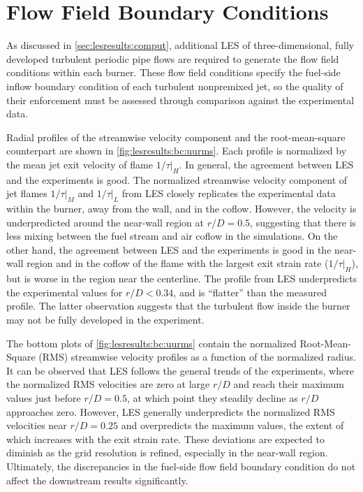 \section{Flow Field Boundary Conditions}
\label{sec:lesresults:bc}

As discussed in \cref{sec:lesresults:comput}, additional LES of three-dimensional, fully developed turbulent periodic pipe flows are required to generate the flow field conditions within each burner. These flow field conditions specify the fuel-side inflow boundary condition of each turbulent nonpremixed jet, so the quality of their enforcement must be assessed through comparison against the experimental data. 

Radial profiles of the streamwise velocity component and the root-mean-square counterpart are shown in \cref{fig:lesresults:bc:uurms}. Each profile is normalized by the mean jet exit velocity of flame $1/\tau|_H$. In general, the agreement between LES and the experiments is good. The normalized streamwise velocity component of jet flames $1/\tau|_M$ and $1/\tau|_L$ from LES closely replicates the experimental data within the burner, away from the wall, and in the coflow. However, the velocity is underpredicted around the near-wall region at $r/D = 0.5$, suggesting that there is less mixing between the fuel stream and air coflow in the simulations. On the other hand, the agreement between LES and the experiments is good in the near-wall region and in the coflow of the flame with the largest exit strain rate ($1/\tau|_H$), but is worse in the region near the centerline. The profile from LES underpredicts the experimental values for $r/D < 0.34$, and is ``flatter'' than the measured profile. The latter observation suggests that the turbulent flow inside the burner may not be fully developed in the experiment.

The bottom plots of \cref{fig:lesresults:bc:uurms} contain the normalized Root-Mean-Square (RMS) streamwise velocity profiles as a function of the normalized radius. It can be observed that LES follows the general trends of the experiments, where the normalized RMS velocities are zero at large $r/D$ and reach their maximum values just before $r/D = 0.5$, at which point they steadily decline as $r/D$ approaches zero. However, LES generally underpredicts the normalized RMS velocities near $r/D = 0.25$ and overpredicts the maximum values, the extent of which increases with the exit strain rate. These deviations are expected to diminish as the grid resolution is refined, especially in the near-wall region. Ultimately, the discrepancies in the fuel-side flow field boundary condition do not affect the downstream results significantly.

